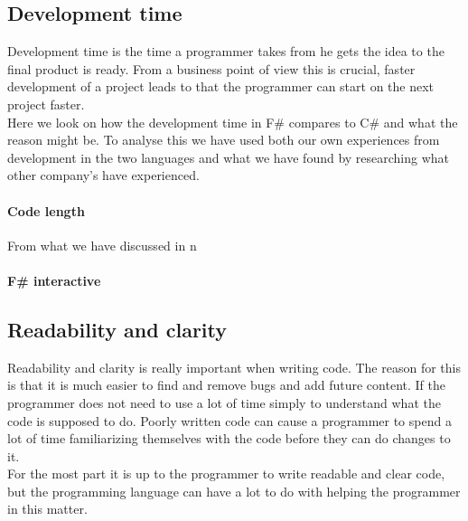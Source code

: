 \documentclass[12pt, a4paper]{article}
\begin{document}
\subsection{Development time}
Development time is the time a programmer takes from he gets the idea to the final product is ready. From a business point of view this is crucial, faster development of a project leads to that the programmer can start on the next project faster.\\

Here we look on how the development time in F\# compares to C\# and what the reason might be. To analyse this we have used both our own experiences from development in the two languages and what we have found by researching what other company's have experienced.\\

\paragraph{Code length}

From what we have discussed in n

\paragraph{F\# interactive}


\newpage
\subsection{Readability and clarity}
Readability and clarity is really important when writing code. The reason for this is that it is much easier to find and remove bugs and add future content. If the programmer does not need to use a lot of time simply to understand what the code is supposed to do. Poorly written code can cause a programmer to spend a lot of time familiarizing themselves with the code before they can do changes to it.\\

For the most part it is up to the programmer to write readable and clear code, but the programming language can have a lot to do with helping the programmer in this matter.\\

\end{document}
